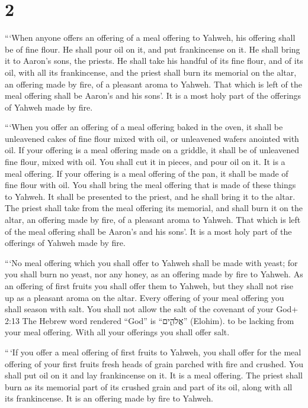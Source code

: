 \hypertarget{section-1}{%
\section{2}\label{section-1}}

 ```When anyone offers an offering of a meal offering to
Yahweh, his offering shall be of fine flour. He shall pour oil on it,
and put frankincense on it.  He shall bring it to Aaron's
sons, the priests. He shall take his handful of its fine flour, and of
its oil, with all its frankincense, and the priest shall burn its
memorial on the altar, an offering made by fire, of a pleasant aroma to
Yahweh.  That which is left of the meal offering shall be
Aaron's and his sons'. It is a most holy part of the offerings of Yahweh
made by fire.

 ```When you offer an offering of a meal offering baked in
the oven, it shall be unleavened cakes of fine flour mixed with oil, or
unleavened wafers anointed with oil.  If your offering is a
meal offering made on a griddle, it shall be of unleavened fine flour,
mixed with oil.  You shall cut it in pieces, and pour oil on
it. It is a meal offering.  If your offering is a meal
offering of the pan, it shall be made of fine flour with oil.
 You shall bring the meal offering that is made of these
things to Yahweh. It shall be presented to the priest, and he shall
bring it to the altar.  The priest shall take from the meal
offering its memorial, and shall burn it on the altar, an offering made
by fire, of a pleasant aroma to Yahweh.  That which is left
of the meal offering shall be Aaron's and his sons'. It is a most holy
part of the offerings of Yahweh made by fire.

 ```No meal offering which you shall offer to Yahweh shall
be made with yeast; for you shall burn no yeast, nor any honey, as an
offering made by fire to Yahweh.  As an offering of first
fruits you shall offer them to Yahweh, but they shall not rise up as a
pleasant aroma on the altar.  Every offering of your meal
offering you shall season with salt. You shall not allow the salt of the
covenant of your God+ 2:13 The Hebrew word rendered ``God'' is
``אֱלֹהִ֑ים'' (Elohim). to be lacking from your meal offering. With all
your offerings you shall offer salt.

 ``\,`If you offer a meal offering of first fruits to
Yahweh, you shall offer for the meal offering of your first fruits fresh
heads of grain parched with fire and crushed.  You shall
put oil on it and lay frankincense on it. It is a meal offering.
 The priest shall burn as its memorial part of its crushed
grain and part of its oil, along with all its frankincense. It is an
offering made by fire to Yahweh.

